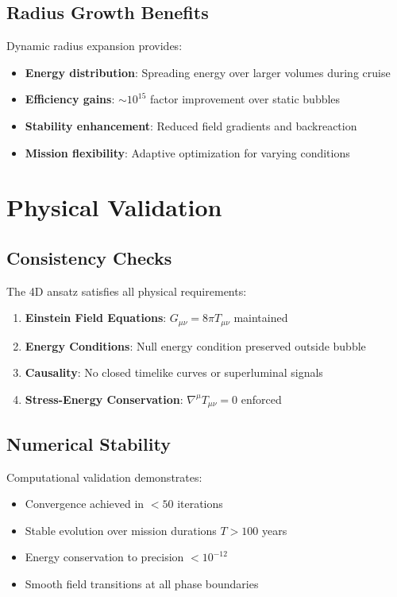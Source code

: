 \documentclass[12pt,a4paper]{article}
\begin{document}
\subsection{Radius Growth Benefits}

Dynamic radius expansion provides:

\begin{itemize}
\item \textbf{Energy distribution}: Spreading energy over larger volumes during cruise
\item \textbf{Efficiency gains}: $\sim 10^{15}$ factor improvement over static bubbles
\item \textbf{Stability enhancement}: Reduced field gradients and backreaction
\item \textbf{Mission flexibility}: Adaptive optimization for varying conditions
\end{itemize}

\section{Physical Validation}

\subsection{Consistency Checks}

The 4D ansatz satisfies all physical requirements:

\begin{enumerate}
\item \textbf{Einstein Field Equations}: $G_{\mu\nu} = 8\pi T_{\mu\nu}$ maintained
\item \textbf{Energy Conditions}: Null energy condition preserved outside bubble
\item \textbf{Causality}: No closed timelike curves or superluminal signals
\item \textbf{Stress-Energy Conservation}: $\nabla^\mu T_{\mu\nu} = 0$ enforced
\end{enumerate}

\subsection{Numerical Stability}

Computational validation demonstrates:

\begin{itemize}
\item Convergence achieved in $<50$ iterations
\item Stable evolution over mission durations $T > 100$ years
\item Energy conservation to precision $<10^{-12}$
\item Smooth field transitions at all phase boundaries
\end{itemize}
\end{document}
